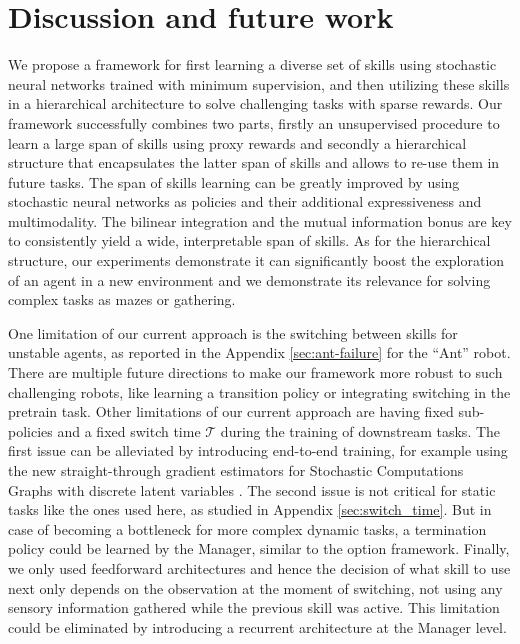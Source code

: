 \documentclass{article} %
\begin{document}
\section{Discussion and future work}
We propose a framework for first learning a diverse set of skills using stochastic neural networks trained with minimum supervision, and then utilizing these skills in a hierarchical architecture to solve challenging tasks with sparse rewards. Our framework successfully combines two parts, firstly an unsupervised procedure to learn a large span of skills using proxy rewards and secondly a hierarchical structure that encapsulates the latter span of skills and allows to re-use them in future tasks. The span of skills learning can be greatly improved by using stochastic neural networks as policies and their additional expressiveness and multimodality. The bilinear integration and the mutual information bonus are key to consistently yield a wide, interpretable span of skills. As for the hierarchical structure, our experiments demonstrate it can significantly boost the exploration of an agent in a new environment and we demonstrate its relevance for solving complex tasks as mazes or gathering. 

One limitation of our current approach is the switching between skills for unstable agents, as reported in the Appendix \ref{sec:ant-failure} for the “Ant” robot. There are multiple future directions to make our framework more robust to such challenging robots, like learning a transition policy or integrating switching in the pretrain task. 
Other limitations of our current approach are having fixed sub-policies and a fixed switch time $\mathcal{T}$ during the training of downstream tasks. The first issue can be alleviated by introducing end-to-end training, for example using the new straight-through gradient estimators for Stochastic Computations Graphs with discrete latent variables \citep{jang2016gumbel, maddison2016concrete}. The second issue is not critical for static tasks like the ones used here, as studied in Appendix \ref{sec:switch_time}. But in case of becoming a bottleneck for more complex dynamic tasks, a termination policy could be learned by the Manager, similar to the option framework.
Finally, we only used feedforward architectures and hence the decision of what skill to use next only depends on the observation at the moment of switching, not using any sensory information gathered while the previous skill was active. This limitation could be eliminated by introducing a recurrent architecture at the Manager level.
\end{document}
